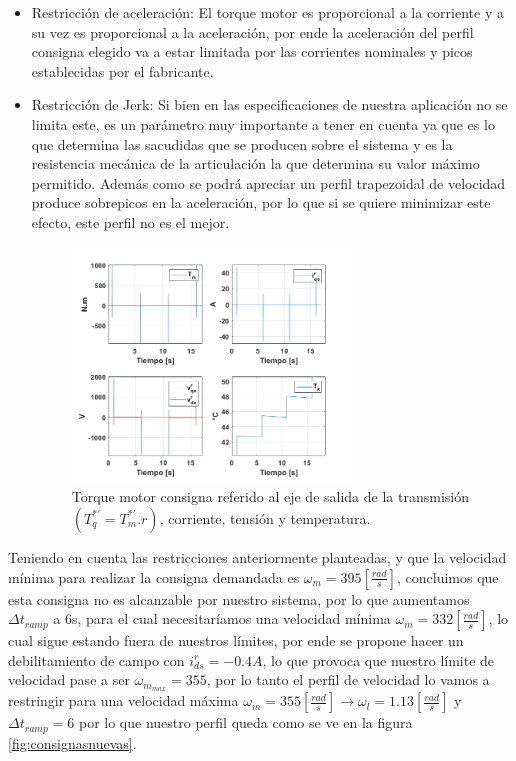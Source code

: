 \documentclass[10pt]{article}
\begin{document}
\begin{itemize}
\begin{itemize}
	 \item Restricción de aceleración: El torque motor es proporcional a la corriente y a su vez es proporcional a la aceleración, por ende la aceleración del perfil consigna elegido
	 va a estar limitada por las corrientes nominales y picos establecidas por el fabricante.

	 \item Restricción de Jerk: Si bien en las especificaciones de nuestra aplicación no se limita este, es un parámetro muy importante a tener en cuenta ya que es lo que determina las sacudidas 
	 que se producen sobre el sistema y es la resistencia mecánica de la articulación la que determina su valor máximo permitido. Además como se podrá apreciar un perfil trapezoidal de velocidad
	 produce sobrepicos en la aceleración, por lo que si se quiere minimizar este efecto, este perfil no es el mejor.
\begin{figure}[h!]
	\centering
	\includegraphics[width=0.7\textwidth]{parametros.png}
	\caption{\label{fig:parametros}Torque motor consigna referido al eje de salida de la transmisión $(T^{*'}_{q}=T^{*'}_{m}.r)$, corriente, tensión y temperatura.}
	\end{figure}
 \end{itemize}

 Teniendo en cuenta las restricciones anteriormente planteadas, y que la velocidad mínima para realizar la consigna demandada es $\omega_{m}=395[\frac{rad}{s}]$, concluimos que esta consigna no es alcanzable
 por nuestro sistema, por lo que aumentamos $\Delta t_{ramp}$ a 6s, para el cual necesitaríamos una velocidad mínima $\omega_{m}=332[\frac{rad}{s}]$, lo cual sigue estando fuera de nuestros límites, por ende se propone hacer un debilitamiento
 de campo con $i^{r}_{ds}=-0.4A$, lo que provoca que nuestro límite de velocidad pase a ser $\omega_{m_{max}}=355$, por lo tanto el perfil de velocidad lo vamos a restringir para una velocidad máxima $\omega_{m}=355[\frac{rad}{s}]\rightarrow \omega_{l}=1.13[\frac{rad}{s}]$ y 
 $\Delta t_{ramp}=6$ por lo que nuestro perfil queda como se ve en la figura \ref{fig:consignasnuevas}.
 

\end{itemize}
\end{document}

